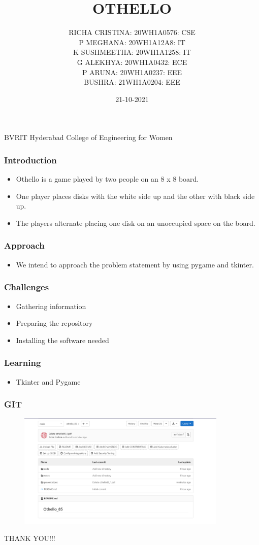 \documentclass[14pt]{beamer}
\title{OTHELLO}
\date{21-10-2021}
\author[Bvrith]{RICHA CRISTINA: 20WH1A0576: CSE  \\  P MEGHANA: 20WH1A12A8: IT \\ K SUSHMEETHA: 20WH1A1258: IT \\ G ALEKHYA: 20WH1A0432: ECE \\ P ARUNA: 20WH1A0237: EEE \\ BUSHRA: 21WH1A0204:  EEE }
\begin{document}
    \begin{frame}
        \titlepage
	\small{BVRIT Hyderabad College of Engineering for Women}
    \end{frame}
    \begin{frame}
	\frametitle{Introduction}
        \begin{itemize}
	       \item Othello is a game played by two people on an 8 x 8 board.
            \item One player places disks with the white side up and the other with black side up.
            \item The players alternate placing one disk on an unoccupied space on the board.
	\end{itemize}
    \end{frame}

    \begin{frame}
	    \frametitle{Approach}
	\begin{itemize}
	    \item We intend to approach the problem statement by using pygame and tkinter.
	\end{itemize}
    \end{frame}


    \begin{frame}
        \frametitle{Challenges}
	\begin{itemize}
	    \item Gathering information
          \item Preparing the repository
          \item Installing the software needed
	\end{itemize}
    \end{frame}
    \begin{frame}
	\frametitle{Learning}
        \begin{itemize}
	    \item Tkinter and Pygame
        \end{itemize}
    \end{frame}

    \begin{frame}
	\frametitle{GIT}
         \begin{figure}
	          \includegraphics [width = 10cm] {repository.png}
          \end {figure}
    \end{frame}
   
   
    \begin{frame}
	\begin{center}
	     THANK YOU!!!
	\end{center}
    \end{frame}
\end{document}
